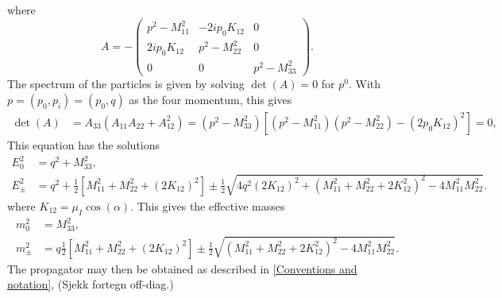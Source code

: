 \documentclass{article}
\begin{document}
where
\begin{equation*}
    A = -
    \begin{pmatrix}
        p^2 - M^2_{11}              & -2 i p_0 K_{12}   & 0             \\
        2 i p_0 K_{12}  & p^2 - M^2_{22}                & 0             \\
        0                           & 0                 & p^2 - M^2_{33}
    \end{pmatrix}.
\end{equation*}
The spectrum of the particles is given by solving $\det(A) = 0$ for $p^0$. With $p = (p_0, p_i) = (p_0, q)$ as the four momentum, this gives
\begin{align*}
    \det(A) & = A_{33} \left(A_{11} A_{22} + A_{12}^2\right)
    = \left(p^2 - M^2_{33}\right)
    \left[
        \left(p^2 - M^2_{11}\right)
        \left(p^2 - M^2_{22}\right)
        - \left(2 p_0 K_{12}\right)^2
    \right] = 0,
\end{align*}
This equation has the solutions
\begin{align}
    E_0^2 &= q^2 + M_{33}^2, \\
    E_\pm^2
    & = q^2 + \frac{1}{2} 
    \left[
        M_{11}^2 + M_{22}^2 + (2K_{12})^2 
    \right]
    \pm \frac{1}{2}
    \sqrt{
        4q^2\left(2K_{12}\right)^2 +
        \left(
            M_{11}^2 + M_{22}^2 + 2K_{12}^2
        \right)^2
        - 4 M_{11}^2 M_{22}^2
    }.
\end{align}
where $K_{12} = \mu_I \cos(\alpha)$. 
This gives the effective masses
\begin{align}
    m_0^2 &= M_{33}^2, \\
    m_\pm^2
    & = q\frac{1}{2} 
    \left[
        M_{11}^2 + M_{22}^2 + (2K_{12})^2 
    \right]
    \pm \frac{1}{2}
    \sqrt{
        \left(
            M_{11}^2 + M_{22}^2 + 2K_{12}^2
        \right)^2
        - 4 M_{11}^2 M_{22}^2
    }.
\end{align}
The propagator may then be obtained as described in \autoref{Conventions and notation}, (Sjekk fortegn off-diag.)
\end{document}
